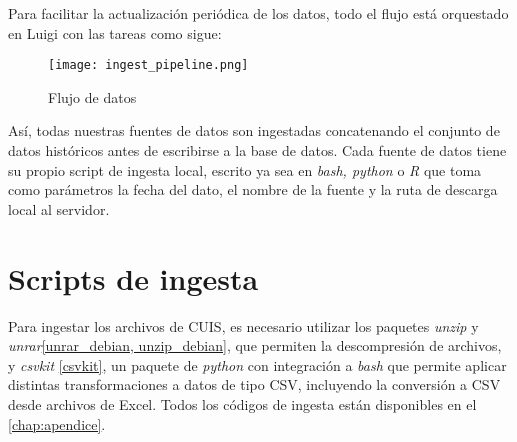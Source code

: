 \par
\noindent
Para facilitar la actualización periódica de los datos, todo el flujo está orquestado en Luigi con las tareas como sigue:
\par
\noindent
\begin{figure}[h]
    \caption{Flujo de datos}
    \centering
    \texttt{[image: ingest\_pipeline.png]}
\end{figure}
Así, todas nuestras fuentes de datos son ingestadas concatenando el conjunto de datos históricos antes de escribirse a la base de datos. Cada fuente de datos tiene su propio script de ingesta local, escrito ya sea en \textit{bash, python} o \textit{R} que toma como parámetros la fecha del dato, el nombre de la fuente y la ruta de descarga local al servidor.
\section*{Scripts de ingesta}
Para ingestar los archivos de CUIS, es necesario utilizar los paquetes \textit{unzip} y \textit{unrar}\ref{unrar_debian, unzip_debian}, que permiten la descompresión de archivos, y \textit{csvkit} \ref{csvkit}, un paquete de \textit{python} con integración a \textit{bash} que permite aplicar distintas transformaciones a datos de tipo CSV, incluyendo la conversión a CSV desde archivos de Excel.
Todos los códigos de ingesta están disponibles en el \autoref{chap:apendice}.

